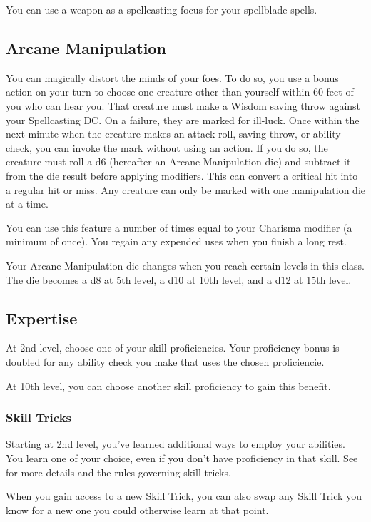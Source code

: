 You can use a weapon as a spellcasting focus for your spellblade spells.

\subsection{Arcane Manipulation}

You can magically distort the minds of your foes. To do so, you use a bonus action on your turn to choose one creature other than yourself within 60 feet of you who can hear you. That creature must make a Wisdom saving throw against your Spellcasting DC. On a failure, they are marked for ill-luck. Once within the next minute when the creature makes an attack roll, saving throw, or ability check, you can invoke the mark without using an action. If you do so, the creature must roll a d6 (hereafter an Arcane Manipulation die) and subtract it from the die result before applying modifiers. This can convert a critical hit into a regular hit or miss. Any creature can only be marked with one manipulation die at a time.

You can use this feature a number of times equal to your Charisma modifier (a minimum of once). You regain any expended uses when you finish a long rest.

Your Arcane Manipulation die changes when you reach certain levels in this class. The die becomes a d8 at 5th level, a d10 at 10th level, and a d12 at 15th level.

\subsection{Expertise}

At 2nd level, choose one of your skill proficiencies. Your proficiency bonus is doubled for any ability check you make that uses the chosen proficiencie.

At 10th level, you can choose another skill proficiency to gain this benefit.

\subsubsection{Skill Tricks}

Starting at 2nd level, you've learned additional ways to employ your abilities. You learn one  of your choice, even if you don't have proficiency in that skill. See  for more details and the rules governing skill tricks.

When you gain access to a new Skill Trick, you can also swap any Skill Trick you know for a new one you could otherwise learn at that point.

